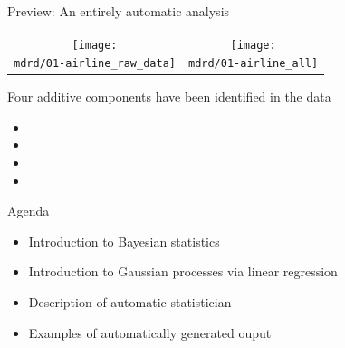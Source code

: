 \begin{frame}{Preview: An entirely automatic analysis}

\newcommand{\wmgd}{0.5\columnwidth}
\newcommand{\hmgd}{3.0cm}
\newcommand{\mdrd}{figures/01-airline}
\newcommand{\mbm}{\hspace{-0.3cm}}
\begin{tabular}{cc}
\mbm \texttt{[image: \\mdrd/01-airline\_raw\_data]} & \texttt{[image: \\mdrd/01-airline\_all]}
\end{tabular}
\vspace{0.5\baselineskip}

{\footnotesize
Four additive components have been identified in the data
\begin{itemize}

  \item  

  \item  

  \item  

  \item  

\end{itemize}
}
\end{frame}

\begin{frame}{Agenda}
  \begin{itemize}
    \item Introduction to Bayesian statistics
    \vspace{\baselineskip}
    \item Introduction to Gaussian processes via linear regression
    \vspace{\baselineskip}
    \item Description of automatic statistician
    \vspace{\baselineskip}
    \item Examples of automatically generated ouput
  \end{itemize}
\end{frame}

